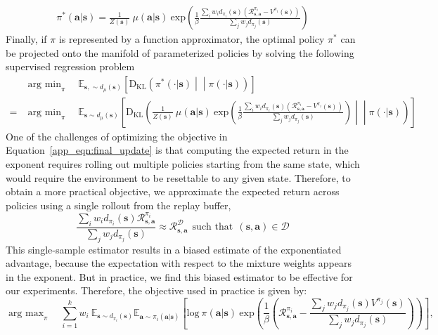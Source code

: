 \documentclass{article} \usepackage{iclr2020_conference,times}
\def\rva{{\mathbf{a}}}
\def\rvs{{\mathbf{s}}}
\newcommand{\weighti}{w_i}
\newcommand{\pii}{\pi_i}
\newcommand{\expec}{\mathbb{E}}
\begin{document}
\begin{equation}
\begin{aligned}
    \pi^*(\rva|\rvs) = \frac{1}{Z(\rvs)} \ \mu(\rva|\rvs) \ \mathrm{exp}\left(\frac{1}{\beta} \frac{\sum_i \weighti d_{\pii}(\rvs) \left(\mathcal{R}_{\rvs,\rva}^{\pii} - V^{\pii}(\rvs)\right)}{\sum_j w_j d_{\pi_j}(\rvs)} \right)
\end{aligned}
\end{equation}
Finally, if $\pi$ is represented by a function approximator, the optimal policy $\pi^*$ can be projected onto the manifold of parameterized policies by solving the following supervised regression problem
\begin{align}
    & \mathop{\mathrm{arg \ min}}_{\pi} \quad \expec_{\rvs, \sim d_\mu(\rvs)} \left[ \mathrm{D_{KL}} \left(\pi^*(\cdot  | \rvs) \middle|\middle| \pi(\cdot  | \rvs)\right) \right]\\
    = & \mathop{\mathrm{arg \ min}}_{\pi} \quad \expec_{\rvs \sim d_\mu(\rvs)} \left[ \mathrm{D_{KL}} \left(\frac{1}{Z(\rvs)} \ \mu(\rva | \rvs) \ \mathrm{exp}\left(\frac{1}{\beta} \frac{\sum_i \weighti d_{\pii}(\rvs) \left(\mathcal{R}_{\rvs,\rva}^{\pii} - V^{\pii}(\rvs)\right)}{\sum_j w_j d_{\pi_j}(\rvs)} \right) \middle|\middle| \pi(\cdot | \rvs)\right) \right]
    \label{app_eqn:final_update}
\end{align}
One of the challenges of optimizing the objective in Equation~\ref{app_eqn:final_update} is that computing the expected return in the exponent requires rolling out multiple policies starting from the same state, which would require the environment to be resettable to any given state. Therefore, to obtain a more practical objective, we approximate the expected return across policies using a single rollout from the replay buffer,
\begin{equation}
    \frac{\sum_i \weighti d_{\pii}(\rvs) \mathcal{R}^{\pii}_{\rvs, \rva}}{\sum_j w_j d_{\pi_j}(\rvs)} \approx \mathcal{R}^{\mathcal{D}}_{\rvs, \rva} ~~ \text{such that} ~~ (\rvs, \rva) \in \mathcal{D} 
\end{equation}
This single-sample estimator results in a biased estimate of the exponentiated advantage, because the expectation with respect to the mixture weights appears in the exponent. But in practice, we find this biased estimator to be effective for our experiments.
Therefore, the objective used in practice is given by:
\begin{equation}
    \mathop{\mathrm{arg \ max}}_{\pi} \quad \sum_{i=1}^k \weighti \ \expec_{\rvs \sim d_{\pii}(\rvs)} \expec_{\rva \sim \pii(\rva | \rvs)} \left[ \mathrm{log} \ \pi (\rva | \rvs) \ \mathrm{exp}\left(\frac{1}{\beta} \left(\mathcal{R}_{\rvs,\rva}^{\pii} - \frac{\sum_j w_j d_{\pi_j}(\rvs) V^{\pi_j}(\rvs)}{\sum_j w_j d_{\pi_j}(\rvs)} \right) \right) \right] ,
    \label{eqn:AWROffPolicyApp}
\end{equation}
\end{document}
